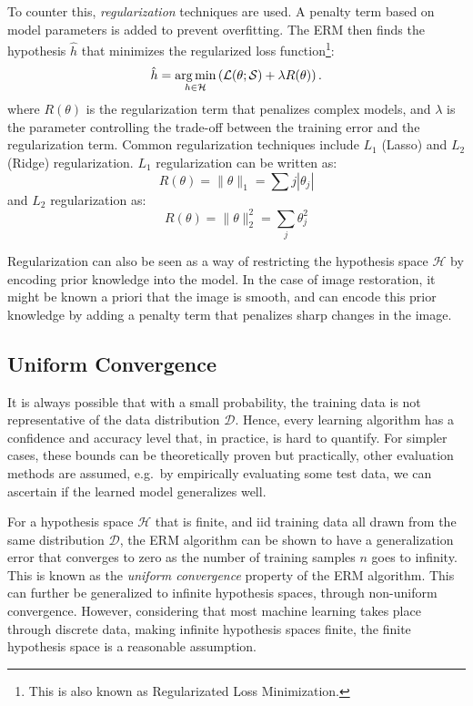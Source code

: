 To counter this, \textit{regularization} techniques are used. A penalty term based on model parameters is added to prevent overfitting. The \gls{ERM} then finds the hypothesis $\hat{h}$ that minimizes the regularized loss function\footnote{This is also known as Regularizated Loss Minimization.}:
\begin{equation}
    \hat{h} = \operatorname*{arg\,min}_{h \in \mathcal{H}} \left(\mathcal{L}(\theta; \mathcal{S})  + \lambda R(\theta) \right).
\end{equation}
where $R(\theta)$ is the regularization term that penalizes complex models, and $\lambda$ is the parameter controlling the trade-off between the training error and the regularization term. Common regularization techniques include $L_1$ (Lasso) and $L_2$ (Ridge) regularization. $L_1$ regularization can be written as:
\begin{equation*}
    R(\theta) = \|\theta\|_1 = \sum{j} |\theta_j|
\end{equation*}
and $L_2$ regularization as:
\begin{equation*}
    R(\theta) = \|\theta\|^2_2 = \sum_{j} \theta_j^2
\end{equation*}

Regularization can also be seen as a way of restricting the hypothesis space $\mathcal{H}$ by encoding prior knowledge into the model. In the case of image restoration, it might be known a priori that the image is smooth, and  can encode this prior knowledge by adding a penalty term that penalizes sharp changes in the image.


\subsection{Uniform Convergence}
It is always possible that with a small probability, the training data is not representative of the data distribution $\mathcal{D}$. Hence, every learning algorithm has a confidence and accuracy level that, in practice, is hard to quantify. For simpler cases, these bounds can be theoretically proven but practically, other evaluation methods are assumed, e.g.\ by empirically evaluating some test data, we can ascertain if the learned model generalizes well.

For a hypothesis space $\mathcal{H}$ that is finite, and \gls{iid} training data all drawn from the same distribution $\mathcal{D}$, the \gls{ERM} algorithm can be shown to have a generalization error that converges to zero as the number of training samples $n$ goes to infinity. This is known as the \textit{uniform convergence} property of the \gls{ERM} algorithm. This can further be generalized to infinite hypothesis spaces, through non-uniform convergence. However, considering that most machine learning takes place through discrete data, making infinite hypothesis spaces finite, the finite hypothesis space is a reasonable assumption.
